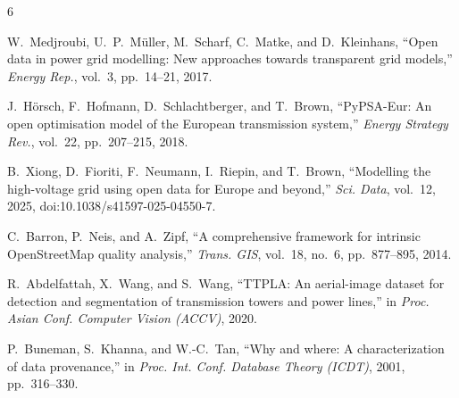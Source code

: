 \documentclass[journal]{IEEEtran}
\begin{document}
\begin{thebibliography}{6}

W.~Medjroubi, U.~P.~M\"{u}ller, M.~Scharf, C.~Matke, and D.~Kleinhans, ``Open data in power grid modelling: New approaches towards transparent grid models,'' \textit{Energy Rep.}, vol.~3, pp.~14--21, 2017.

J.~H\"{o}rsch, F.~Hofmann, D.~Schlachtberger, and T.~Brown, ``PyPSA-Eur: An open optimisation model of the European transmission system,'' \textit{Energy Strategy Rev.}, vol.~22, pp.~207--215, 2018.

B.~Xiong, D.~Fioriti, F.~Neumann, I.~Riepin, and T.~Brown, ``Modelling the high-voltage grid using open data for Europe and beyond,'' \textit{Sci. Data}, vol.~12, 2025, doi:10.1038/s41597-025-04550-7.

C.~Barron, P.~Neis, and A.~Zipf, ``A comprehensive framework for intrinsic OpenStreetMap quality analysis,'' \textit{Trans. GIS}, vol.~18, no.~6, pp.~877--895, 2014.

R.~Abdelfattah, X.~Wang, and S.~Wang, ``TTPLA: An aerial-image dataset for detection and segmentation of transmission towers and power lines,'' in \textit{Proc. Asian Conf. Computer Vision (ACCV)}, 2020.

P.~Buneman, S.~Khanna, and W.-C.~Tan, ``Why and where: A characterization of data provenance,'' in \textit{Proc. Int. Conf. Database Theory (ICDT)}, 2001, pp.~316--330.

\end{thebibliography}
\end{document}
